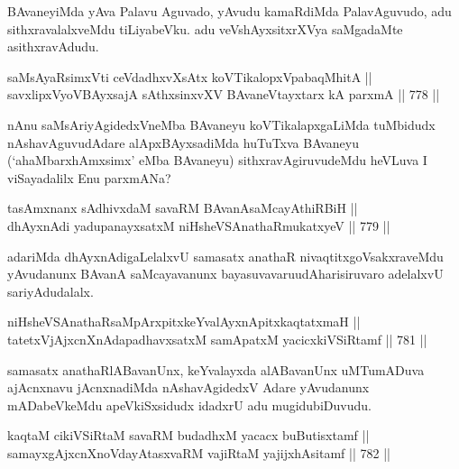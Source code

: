 \begin{artha} 
BAvaneyiMda yAva Palavu Aguvado, yAvudu kamaRdiMda PalavAguvudo, adu sithxravalalxveMdu tiLiyabeVku. adu veVshAyxsitxrXVya saMgadaMte asithxravAdudu.
\end{artha}

\begin{shl}
saMsAyaRsimxVti ceVdadhxvXsAtx koVTikalopxVpabaqMhitA || \\
savxlipxVyoVBAyxsajA sAthxsinxvXV BAvaneVtayxtarx kA parxmA \hfill || 778 ||  
\end{shl}

\begin{artha} 
nAnu saMsAriyAgidedxVneMba BAvaneyu koVTikalapxgaLiMda tuMbidudx 
nAshavAguvudAdare alApxBAyxsadiMda huTuTxva BAvaneyu 
(`ahaMbarxhAmxsimx' eMba BAvaneyu) sithxravAgiruvudeMdu heVLuva I 
viSayadalilx Enu parxmANa?
\end{artha}

\begin{shl}
tasAmxnanx sAdhivxdaM savaRM BAvanAsaMcayAthiRBiH || \\
dhAyxnAdi yadupanayxsatxM niHsheVSAnathaRmukatxyeV \hfill || 779 ||  
\end{shl}

\begin{artha} 
adariMda dhAyxnAdigaLelalxvU samasatx anathaR nivaqtitxgoVsakxraveMdu yAvudanunx BAvanA saMcayavanunx bayasuvavaru\break udAharisiruvaro adelalxvU sariyAdudalalx.
\end{artha}

\begin{shl}
niHsheVSAnathaRsaMpArxpitxkeYvalAyxnApitxkaqtatxmaH || \\
tatetxVjAjxcnXnAdapadhavxsatxM samApatxM yacicxkiVSiRtamf \hfill || 781 ||  
\end{shl}

\begin{artha} 
samasatx anathaRlABavanUnx, keYvalayxda alABavanUnx uMTumADuva ajAcnxnavu jAcnxnadiMda nAshavAgidedxV Adare yAvudanunx mADabeVkeMdu apeVkiSxsidudx idadxrU adu mugidubiDuvudu.
\end{artha}


\begin{shl}
kaqtaM cikiVSiRtaM savaRM budadhxM yacacx buButisxtamf || \\
samayxgAjxcnXnoVdayAtasxvaRM vajiRtaM yajijxhAsitamf \hfill || 782 ||  
\end{shl}

